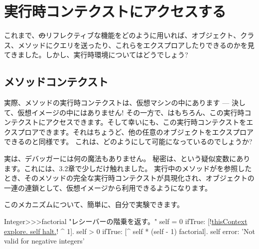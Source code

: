 \documentclass[a4paper,10pt,twoside]{book}
\begin{document}
\section{実行時コンテクストにアクセスする}

これまで、\st のリフレクティブな機能をどのように用いれば、オブジェクト、クラス、メソッドにクエリを送ったり、これらをエクスプロアしたりできるのかを見てきました。しかし、実行時環境についてはどうでしょう?

\subsection{メソッドコンテクスト}

実際、メソッドの実行時コンテクストは、仮想マシンの中にあります --- 決して、仮想イメージの中にはありません! %
その一方で、はもちろん、この実行時コンテクストにアクセスできます。そして幸いにも、この実行時コンテクストをエクスプロアできます。それはちょうど、他の任意のオブジェクトをエクスプロアできるのと同様です。
これは、どのようにして可能になっているのでしょうか?

実は、デバッガーには何の魔法もありません。
秘密は、という疑似変数にあります。これには、3.2章で少しだけ触れました。 %
実行中のメソッドがを参照したとき、そのメソッドの完全な実行時コンテクストが具現化され、オブジェクトの一連の連鎖として、仮想イメージから利用できるようになります。

このメカニズムについて、簡単に、自分で実験できます。


\begin{code}{}
Integer>>>factorial
	"レシーバーの階乗を返す。"
	self = 0 ifTrue: [!\underline{thisContext explore. self halt.}! ^ 1].
	self > 0 ifTrue: [^ self * (self - 1) factorial].
	self error: 'Not valid for negative integers'
\end{code}

\end{document}
